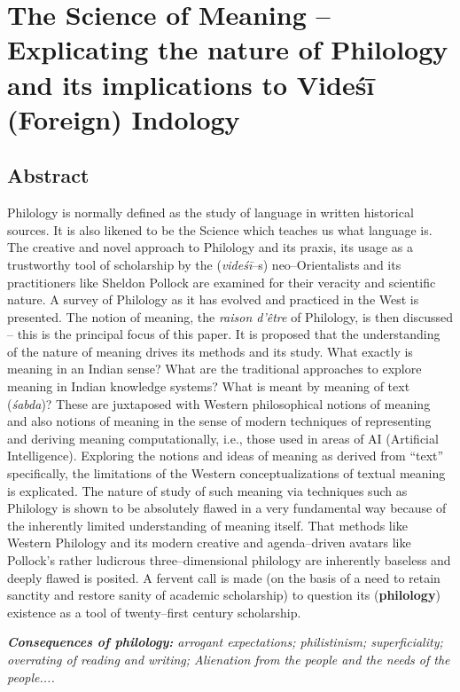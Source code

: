 
\chapter{The Science of Meaning – Explicating the nature of Philology and its implications to Videśī (Foreign) Indology}



\section*{Abstract}

Philology is normally defined as the study of language in written historical sources. It is also likened to be the Science which teaches us what language is. The creative and novel approach to Philology and its praxis, its usage as a trustworthy tool of scholarship by the (\textit{videśī}–s) neo–Orientalists and its practitioners like Sheldon Pollock are examined for their veracity and scientific nature. A survey of Philology as it has evolved and practiced in the West is presented. The notion of meaning, the \textit{raison d’être} of Philology, is then discussed – this is the principal focus of this paper. It is proposed that the understanding of the nature of meaning drives its methods and its study. What exactly is meaning in an Indian sense? What are the traditional approaches to explore meaning in Indian knowledge systems? What is meant by meaning of text (\textit{śabda})? These are juxtaposed with Western philosophical notions of meaning and also notions of meaning in the sense of modern techniques of representing and deriving meaning computationally, i.e., those used in areas of AI (Artificial Intelligence). Exploring the notions and ideas of meaning as derived from “text” specifically, the limitations of the Western conceptualizations of textual meaning is explicated. The nature of study of such meaning via techniques such as Philology is shown to be absolutely flawed in a very fundamental way because of the inherently limited understanding of meaning itself. That methods like Western Philology and its modern creative and agenda–driven avatars like Pollock’s rather ludicrous three–dimensional philology are inherently baseless and deeply flawed is posited. A fervent call is made (on the basis of a need to retain sanctity and restore sanity of academic scholarship) to question its (\textbf{philology}) existence as a tool of twenty–first century scholarship.

\textit{\textbf{Consequences of philology:} arrogant expectations; philistinism; superficiality; overrating of reading and writing; Alienation from the people and the needs of the people.... }

